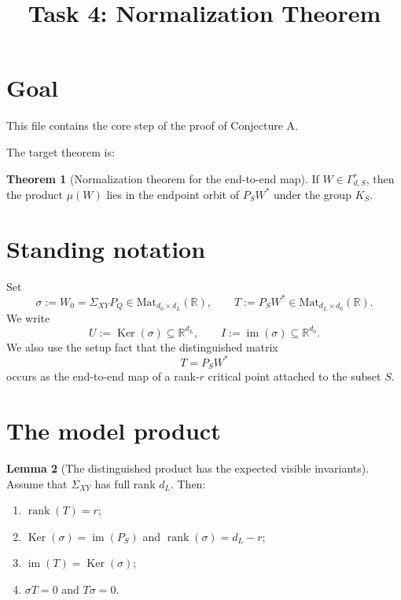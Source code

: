 \documentclass{article}
\title{Task 4: Normalization Theorem}
\date{}
\newcommand{\rk}{\operatorname{rank}}
\newcommand{\R}{\mathbb{R}}
\newcommand{\Mat}{\mathrm{Mat}}
\newcommand{\im}{\operatorname{im}}
\newcommand{\Ker}{\operatorname{Ker}}
\theoremstyle{definition}
\newtheorem{theorem}{Theorem}[section]
\newtheorem{lemma}[theorem]{Lemma}
\begin{document}
\maketitle

\section{Goal}

This file contains the core step of the proof of Conjecture A.

The target theorem is:

\begin{theorem}[Normalization theorem for the end-to-end map]
If $W\in \Gamma_{d,S}^r$, then the product $\mu(W)$ lies in the endpoint orbit of $P_SW^\ast$ under the group $K_S$.
\end{theorem}

\section{Standing notation}

Set
\[
\sigma:=W_0=\Sigma_{XY}P_Q\in \Mat_{d_0\times d_L}(\R),
\qquad
T:=P_SW^\ast\in \Mat_{d_L\times d_0}(\R).
\]
We write
\[
U:=\Ker(\sigma)\subseteq \R^{d_L},
\qquad
I:=\im(\sigma)\subseteq \R^{d_0}.
\]
We also use the setup fact that the distinguished matrix
\[
T=P_SW^\ast
\]
occurs as the end-to-end map of a rank-$r$ critical point attached to the subset
$S$.

\section{The model product}

\begin{lemma}[The distinguished product has the expected visible invariants]\label{lem:model-visible-invariants}
Assume that $\Sigma_{XY}$ has full rank $d_L$. Then:
\begin{enumerate}
\item $\rk(T)=r$;
\item $\Ker(\sigma)=\im(P_S)$ and $\rk(\sigma)=d_L-r$;
\item $\im(T)=\Ker(\sigma)$;
\item $\sigma T=0$ and $T\sigma=0$.
\end{enumerate}
\end{lemma}
\end{document}
